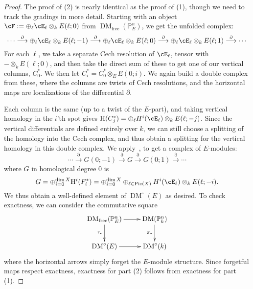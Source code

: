 \documentclass[12pt]{amsart}
\theoremstyle{definition}
\theoremstyle{remark}
\newcommand{\PP}{\mathbb P}
\newcommand{\HH}{\mathrm H}
\newcommand{\Pic}{\operatorname{Pic}}
\def\DM{\operatorname{DM}}
\def\free{\operatorname{free}}
\begin{document}
\begin{proof}
The proof of (2) is nearly identical as the proof of (1), though we need to track the gradings in more detail.  Starting with an object $\cF := \oplus_{\ell} \cE_\ell\otimes_k E(\ell;0)$ from $\DM_{\free}(\PP^n_E)$, we get the unfolded complex:
\[
\cdots \overset{\partial}{\longrightarrow} \oplus_{\ell} \cE_\ell\otimes_k E(\ell;-1) \overset{\partial}{\longrightarrow} \oplus_{\ell} \cE_\ell\otimes_k E(\ell;0) \overset{\partial}{\longrightarrow} \oplus_{\ell} \cE_\ell\otimes_k E(\ell;1)\overset{\partial}{\longrightarrow} \cdots
\]
For each $\ell$, we take a separate Cech resolution of $\cE_\ell$, tensor with $-\otimes_k E(\ell; 0)$, and then take the direct sum of these to get one of our vertical columns, $C^*_0$.  We then let $C^*_i = C^*_0\otimes_E E(0;i)$.  We again build a double complex from these, where the columns are twists of Cech resolutions, and the horizontal maps are localizations of the differential $\partial$.

Each column is the same (up to a twist of the $E$-part), and taking vertical homology in the $i$'th spot gives $\HH(C^*_j)=\oplus_{\ell} H^i(\cE_\ell)\otimes_k E(\ell;-j)$.  Since the vertical differentials are defined entirely over $k$, we can still choose a splitting of the homology into the Cech complex, and thus obtain a splitting for the vertical homology in this double complex.  We apply~\cite[Lemma~3.5]{EFS}, to get a complex of $E$-modules:
\[
\cdots \overset{\partial}{\longrightarrow} G(0;-1) \overset{\partial}{\longrightarrow} G \overset{\partial}{\longrightarrow}G(0;1) \overset{\partial}{\longrightarrow} \cdots
\]
where $G$ in homological degree $0$ is
\[
G = \oplus_{i=0}^{\dim X} \HH^i(F^*_i) =  \oplus_{i=0}^{\dim X}\oplus_{\ell \in \Pic(X)} H^i(\cE_\ell )\otimes_k E(\ell;-i).
\]
We thus obtain a well-defined element of $\DM^\circ(E)$ as desired.  To check exactness, we can consider the commutative square
\[
\xymatrix{
\DM_{\free}(\PP^n_E)\ar[r]\ar[d]_{\tau_*} &\DM(\PP^n_k)\ar[d]_{\pi_*}\\
\DM^\circ(E)\ar[r]&\DM^\circ(k)
}
\]
where the horizontal arrows simply forget the $E$-module structure.  Since forgetful maps respect exactness, exactness for part (2) follows from exactness for part (1).
\end{proof}
\end{document}
